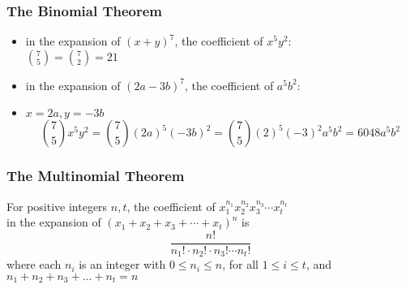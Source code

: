 \documentclass[dvipsnames]{beamer}
\begin{document}
\begin{frame}
  \frametitle{The Binomial Theorem}

  \begin{example}
    \begin{itemize}
      \item in the expansion of $(x+y)^7$, the coefficient of $x^5 y^2$:\\
        ${7\choose 5} = {7 \choose 2} = 21$
    \end{itemize}
  \end{example}

  \pause
  \begin{example}
    \begin{itemize}
      \item in the expansion of $(2a-3b)^7$, the coefficient of $a^5 b^2$:
      \item $x=2a, y=-3b$
      \begin{equation*}
      {7\choose 5} x^5 y^2 = {7\choose 5} (2a)^5 (-3b)^2
                           = {7\choose 5} (2)^5 (-3)^2 a^5 b^2 = 6048 a^5 b^2
      \end{equation*}
    \end{itemize}
  \end{example}  
\end{frame}

\begin{frame}
  \frametitle{The Multinomial Theorem}

  \begin{theorem}
    For positive integers $n, t$, the coefficient of
    $x_{1}^{n_1} x_{2}^{n_2} x_{3}^{n_3} \cdots x_{t}^{n_t}$\\
    in the expansion of $(x_1 + x_2 + x_3 + \cdots + x_t)^n$ is
    \begin{equation*}
      \frac{n!}{n_1! \cdot n_2! \cdot n_3! \cdots n_t!}
    \end{equation*}
    where each $n_i$ is an integer with $0 \leq n_i \leq n$,
    for all $1 \leq i \leq t$, and\\
    $n_1 + n_2 + n_3 + ... + n_t = n$
  \end{theorem}
\end{frame}
\end{document}
